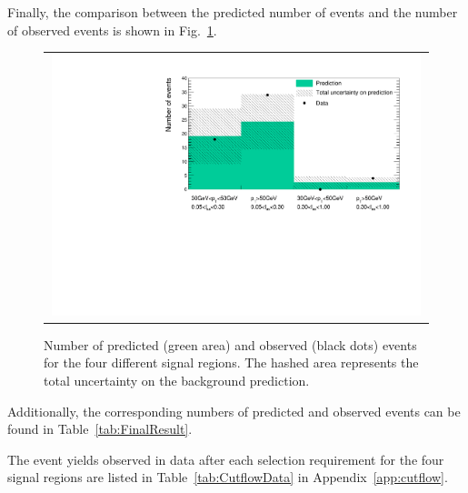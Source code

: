 Finally, the comparison between the predicted number of events and the number of observed events is shown in Fig.~\ref{fig:FinalResult}.
\begin{figure}[!t]
  \centering 
  \begin{tabular}{c}
    \includegraphics[width=0.99\textwidth]{figures/analysis/Results/FinalResultPlot.pdf} 
  \end{tabular}
  \caption{Number of predicted (green area) and observed (black dots) events for the four different signal regions. The hashed area represents the total uncertainty on the background prediction.}
  \label{fig:FinalResult}
 \vspace{50pt}
\end{figure} 
Additionally, the corresponding numbers of predicted and observed events can be found in Table~\ref{tab:FinalResult}.
\renewcommand{\arraystretch}{1.5}
\begin{table}[!h]
\centering
\caption{Number of predicted and observed events for the four different signal regions.}
\label{tab:FinalResult}
\end{table}
The event yields observed in data after each selection requirement for the four signal regions are listed in Table~\ref{tab:CutflowData} in Appendix~\ref{app:cutflow}.


